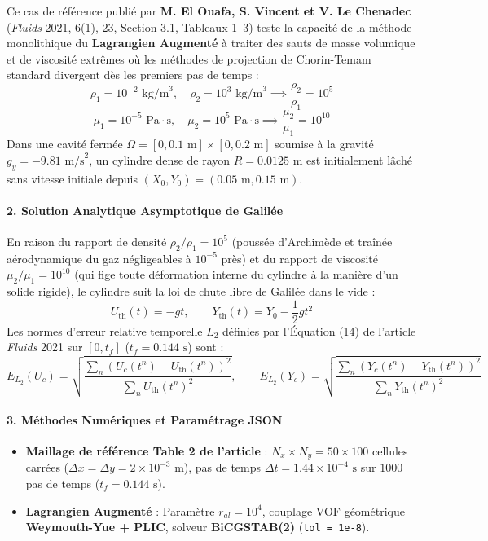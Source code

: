 \documentclass[
  10pt,
]{article}
\providecommand{\tightlist}{%
  \setlength{\itemsep}{0pt}\setlength{\parskip}{0pt}}
\begin{document}
Ce cas de référence publié par \textbf{M. El Ouafa, S. Vincent et V. Le
Chenadec} (\emph{Fluids} 2021, 6(1), 23, Section 3.1, Tableaux 1--3)
teste la capacité de la méthode monolithique du \textbf{Lagrangien
Augmenté} à traiter des sauts de masse volumique et de viscosité
extrêmes où les méthodes de projection de Chorin-Temam standard
divergent dès les premiers pas de temps :
\[\rho_1 = 10^{-2}\text{ kg/m}^3, \quad \rho_2 = 10^{3}\text{ kg/m}^3 \implies \frac{\rho_2}{\rho_1} = 10^5\]
\[\mu_1 = 10^{-5}\text{ Pa}\cdot\text{s}, \quad \mu_2 = 10^{5}\text{ Pa}\cdot\text{s} \implies \frac{\mu_2}{\mu_1} = 10^{10}\]
Dans une cavité fermée
\(\Omega = [0, 0.1\text{ m}] \times [0, 0.2\text{ m}]\) soumise à la
gravité \(g_y = -9.81\text{ m/s}^2\), un cylindre dense de rayon
\(R = 0.0125\text{ m}\) est initialement lâché sans vitesse initiale
depuis \((X_0, Y_0) = (0.05\text{ m}, 0.15\text{ m})\).

\paragraph{2. Solution Analytique Asymptotique de
Galilée}\label{solution-analytique-asymptotique-de-galiluxe9e}

En raison du rapport de densité \(\rho_2 / \rho_1 = 10^5\) (poussée
d'Archimède et traînée aérodynamique du gaz négligeables à \(10^{-5}\)
près) et du rapport de viscosité \(\mu_2 / \mu_1 = 10^{10}\) (qui fige
toute déformation interne du cylindre à la manière d'un solide rigide),
le cylindre suit la loi de chute libre de Galilée dans le vide :
\[U_{\text{th}}(t) = -g t, \qquad Y_{\text{th}}(t) = Y_0 - \frac{1}{2} g t^2\]
Les normes d'erreur relative temporelle \(L_2\) définies par l'Équation
(14) de l'article \emph{Fluids} 2021 sur \([0, t_f]\)
(\(t_f = 0.144\text{ s}\)) sont :
\[E_{L_2}(U_c) = \sqrt{\frac{\sum_n \left(U_c(t^n) - U_{\text{th}}(t^n)\right)^2}{\sum_n U_{\text{th}}(t^n)^2}}, \qquad E_{L_2}(Y_c) = \sqrt{\frac{\sum_n \left(Y_c(t^n) - Y_{\text{th}}(t^n)\right)^2}{\sum_n Y_{\text{th}}(t^n)^2}}\]

\paragraph{3. Méthodes Numériques et Paramétrage
JSON}\label{muxe9thodes-numuxe9riques-et-paramuxe9trage-json-9}

\begin{itemize}
\tightlist
\item
  \textbf{Maillage de référence Table 2 de l'article} :
  \(N_x \times N_y = 50 \times 100\) cellules carrées
  (\(\Delta x = \Delta y = 2 \times 10^{-3}\text{ m}\)), pas de temps
  \(\Delta t = 1.44 \times 10^{-4}\text{ s}\) sur \(1000\) pas de temps
  (\(t_f = 0.144\text{ s}\)).
\item
  \textbf{Lagrangien Augmenté} : Paramètre \(r_{al} = 10^4\), couplage
  VOF géométrique \textbf{Weymouth-Yue + PLIC}, solveur
  \textbf{BiCGSTAB(2)} (\texttt{tol\ =\ 1e-8}).
\end{itemize}
\end{document}
